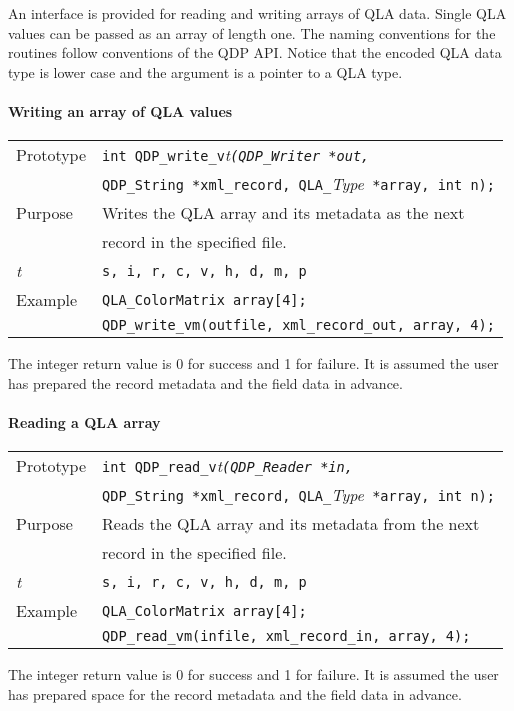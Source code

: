 \documentclass{article}
\newcommand{\allQLATypes}{{\tt s, i, r, c, v, h, d, m, p}}
\newcommand{\itQLAt}{\it t}
\newcommand{\QMDhandle}{{\tt QDP\_String }}
\begin{document}
An interface is provided for reading and writing arrays of QLA data.
Single QLA values can be passed as an array of length one.  The naming
conventions for the routines follow conventions of the QDP API.
Notice that the encoded QLA data type is lower case and the argument is a
pointer to a QLA type.

\paragraph{Writing an array of QLA values}

\begin{flushleft}
  \begin{tabular}{|l|l|}
  \hline
  Prototype      & \verb|int QDP_write_v|\itQLAt\verb|(QDP_Writer *out, |\\
                 & \QMDhandle \verb|*xml_record, QLA_|{\it Type}\verb| *array, int n);|\\
    \hline
  Purpose        & Writes the QLA array and its metadata as the next \\
                 & record in the specified file. \\
\hline
  \itQLAt     & \allQLATypes \\
   \hline
  Example  & \verb|QLA_ColorMatrix array[4];| \\
           & \verb|QDP_write_vm(outfile, xml_record_out, array, 4);| \\
   \hline
 \end{tabular}
\end{flushleft}
%
The integer return value is 0 for success and 1 for failure.  It is
assumed the user has prepared the record metadata and the field data
in advance.

\paragraph{Reading a QLA array}

\begin{flushleft}
  \begin{tabular}{|l|l|}
  \hline
  Prototype      & \verb|int QDP_read_v|\itQLAt\verb|(QDP_Reader *in, |\\
                 &   \QMDhandle \verb|*xml_record, QLA_|{\it Type}\verb| *array, int n);|\\
    \hline
  Purpose        & Reads the QLA array and its metadata from the next \\
                 & record in the specified file. \\
\hline
  \itQLAt     & \allQLATypes \\
   \hline
  Example  & \verb|QLA_ColorMatrix array[4];| \\
           & \verb|QDP_read_vm(infile, xml_record_in, array, 4);| \\
   \hline
 \end{tabular}
\end{flushleft}
%
The integer return value is 0 for success and 1 for failure.  It is
assumed the user has prepared space for the record metadata and the
field data in advance.
\end{document}
